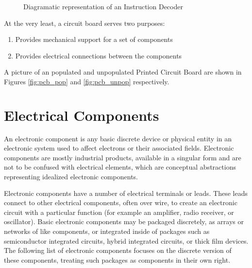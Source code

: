 \begin{figure}[p]

\caption{Diagramatic representation of an Instruction Decoder}
\label{fig:geode}
\end{figure}


At the very least, a circuit board serves two purposes:
\begin{enumerate}
\item Provides mechanical support for a set of components
\item Provides electrical connections between the components
\end{enumerate}

A picture of an populated and unpopulated Printed Circuit Board are shown in Figures \ref{fig:pcb_pop} and \ref{fig:pcb_unpop} respectively. 

\section{Electrical Components}

An electronic component is any basic discrete device or physical entity in an electronic system used to affect electrons or their associated fields. Electronic components are mostly industrial products, available in a singular form and are not to be confused with electrical elements, which are conceptual abstractions representing idealized electronic components.

Electronic components have a number of electrical terminals or leads. These leads connect to other electrical components, often over wire, to create an electronic circuit with a particular function (for example an amplifier, radio receiver, or oscillator). Basic electronic components may be packaged discretely, as arrays or networks of like components, or integrated inside of packages such as semiconductor integrated circuits, hybrid integrated circuits, or thick film devices. The following list of electronic components focuses on the discrete version of these components, treating such packages as components in their own right. 

